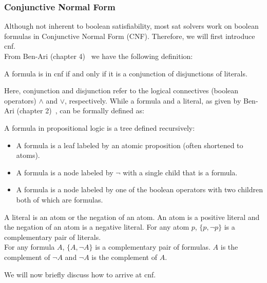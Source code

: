 \subsubsection{Conjunctive Normal Form}\label{sec:CNF}
Although not inherent to boolean satisfiability, most \acrshort{sat} solvers work on boolean formulas in Conjunctive Normal Form (CNF). Therefore, we will first introduce \acrshort{cnf}.
\\
From Ben-Ari (chapter 4)~\cite{Math-Logic-for-CompSci} we have the following definition:
\begin{definition}\label{def:CNF}
    A formula is in \acrshort{cnf} if and only if it is a conjunction of disjunctions of literals.
\end{definition}
Here, conjunction and disjunction refer to the logical connectives (boolean operators) $\wedge$ and $\vee$, respectively. While a formula and a literal, as given by Ben-Ari (chapter 2)~\cite{Math-Logic-for-CompSci}, can be formally defined as:
\begin{definition}\label{def:propositional_formulas}
    A formula in propositional logic is a tree defined recursively:
    \begin{itemize}
        \item A formula is a leaf labeled by an atomic proposition (often shortened
        to atoms).
        \item A formula is a node labeled by $\neg$ with a single child that is a formula.
        \item A formula is a node labeled by one of the boolean operators with two children both of which are formulas.
    \end{itemize}
\end{definition}
\begin{definition}\label{def:propositional_atoms}
    A literal is an atom or the negation of an atom. An atom is a positive
    literal and the negation of an atom is a negative literal. For any atom $p$, $\{p,\neg p\}$ is a complementary pair of literals.
    \\
    For any formula $A$, $\{A,\neg A\}$ is a complementary pair of formulas. $A$ is the complement of $\neg A$ and $\neg A$ is the complement of $A$.
\end{definition}
We will now briefly discuss how to arrive at \acrshort{cnf}.

